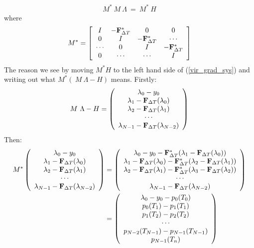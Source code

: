 \begin{align}
M^* \ M \ \Lambda \ = \ M^* \ H \label{vir_grad_sys}
\end{align}
where 
\begin{align}
M^*= \left[ \begin{array}{cccc}
   I & -\bold{F}_{\Delta T}^* & 0 & 0 \\  
   0 & I & -\bold{F}_{\Delta T}^* & \cdots \\ 
   \cdots &0 & I  & -\bold{F}_{\Delta T}^* \\
   0 &\cdots &\cdots & I   \\
   \end{array}  \right]
\end{align}
The reason we see by moving $M^*H$ to the left hand side of (\ref{vir_grad_sys}) and writing out what $M^*( \ M \ \Lambda-H)$ means. Firstly:
\begin{align}
M \ \Lambda - H = \left( \begin{array}{c}
	\lambda_0 -y_0 \\
	\lambda_1 - \bold{F}_{\Delta T}(\lambda_0)\\
	\lambda_2 - \bold{F}_{\Delta T}(\lambda_1) \\
	\cdots \\
	\lambda_{N-1} -\bold{F}_{\Delta T}(\lambda_{N-2})
	\end{array} \right)
\end{align}
Then:
\begin{align}
M^*\left( \begin{array}{c}
	\lambda_0-y_0 \\
	\lambda_1 - \bold{F}_{\Delta T}(\lambda_0)\\
	\lambda_2 - \bold{F}_{\Delta T}(\lambda_1) \\
	\cdots \\
	\lambda_{N-1} -\bold{F}_{\Delta T}(\lambda_{N-2})
	\end{array} \right) &=
	\left( \begin{array}{c}
	\lambda_0-y_0 -\bold{F}_{\Delta T}^*(\lambda_1 -\bold{F}_{\Delta T}(\lambda_0))\\
	\lambda_1 -\bold{F}_{\Delta T}(\lambda_0) -\bold{F}_{\Delta T}^*(\lambda_2 - \bold{F}_{\Delta T}(\lambda_1))\\
	\lambda_2 - \bold{F}_{\Delta T}(\lambda_1) -\bold{F}_{\Delta T}^*(\lambda_3 - \bold{F}_{\Delta T}(\lambda_2))\\
	\cdots \\
	\lambda_{N-1} -\bold{F}_{\Delta T}(\lambda_{N-2})
	\end{array} \right)
	\\
	&=\left( \begin{array}{c}
	\lambda_0-y_0 - p_0(T_0)\\
	p_0(T_1)-p_1(T_1)\\
	p_1(T_2)-p_2(T_2)\\
	\cdots \\
	p_{N-2}(T_{N-1})-p_{N-1}(T_{N-1}) \\
	p_{N-1}(T_n)
	\end{array} \right)
\end{align}

